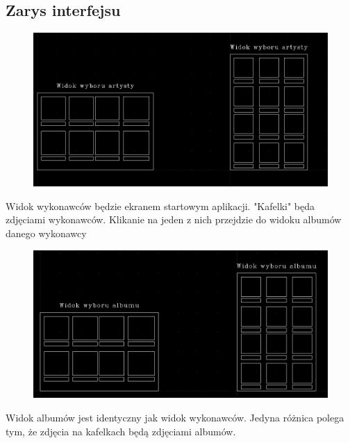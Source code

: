 \subsection{Zarys interfejsu}

\begin{figure}[H]
	\centering
	\includegraphics[width=1\textwidth]{images/mockup_artysta.png}
	\caption{}
\end{figure}

Widok wykonawców będzie ekranem startowym aplikacji. "Kafelki" będa zdjęciami wykonawców. Klikanie na jeden z nich przejdzie do widoku albumów danego wykonawcy

\begin{figure}[H]
	\centering
	\includegraphics[width=1\textwidth]{images/mockup_albumy.png}
	\caption{}
\end{figure}

Widok albumów jest identyczny jak widok wykonawców. Jedyna różnica polega tym, że zdjęcia na kafelkach będą zdjęciami albumów.

